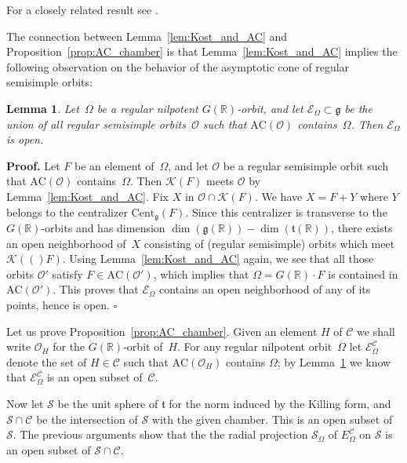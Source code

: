 \documentclass[10pt,leqno]{article}
\newtheorem{lemma}[equation]{Lemma}
\newcommand{\qed}{\hfill $\square$ \medskip}
\newenvironment{proof}[1][Proof]{\noindent\textbf{#1.} }{\qed}
\newcommand{\R}{\mathbb R}
\renewcommand{\t}{\mathfrak t}
\newcommand{\g}{\mathfrak g}
\newcommand{\AC}{\mathrm{AC}}
\newcommand{\Kostant}[1]{\mathcal{K}(#1)}
\newcommand{\ECom}{\mathcal{E}^{\mathcal{C}}_\Omega}
\begin{document}
For a closely related result see \cite[Proposition 3.5]{fm}.

The connection between Lemma~\ref{lem:Kost_and_AC} and Proposition~\ref{prop:AC_chamber} is that Lemma~\ref{lem:Kost_and_AC}  implies the  following observation on the behavior of the asymptotic cone of regular semisimple orbits: 

\begin{lemma}\label{lem:AC_containment} Let~$\Omega$ be a regular nilpotent $G(\R)$-orbit, and let $\mathcal{E}_\Omega \subset \g$ be the union of all regular semisimple orbits~$\mathcal{O}$ such that $\AC(\mathcal{O})$ contains~$\Omega$. Then $\mathcal{E}_\Omega$ is open. 
\end{lemma}

\begin{proof}
Let $F$ be an element of~$\Omega$, and let $\mathcal{O}$  be a regular semisimple orbit such that $\AC(\mathcal{O})$ contains~$\Omega$.
Then $\Kostant{F}$ meets $\mathcal{O}$ by  Lemma~\ref{lem:Kost_and_AC}. 
Fix $X$ in $\mathcal{O} \cap \Kostant{F}$.
We have $X =F+Y$ where $Y$ belongs to the centralizer $\mathrm{Cent}_\g(F)$.
Since this centralizer is transverse to the $G(\R)$-orbits and has dimension $\dim(\g(\R))-\dim(\t(\R))$,
there exists an open neighborhood of~$X$ consisting of (regular semisimple) orbits  which meet $\Kostant(F)$.
Using Lemma~\ref{lem:Kost_and_AC} again, we see that all those orbits $\mathcal{O}'$ satisfy $F \in \AC(\mathcal{O}')$,
which implies that $\Omega = G(\R) \cdot F$ is contained in $\AC(\mathcal{O}')$.
This proves that $\mathcal{E}_\Omega$ contains an open neighborhood of any of its points, hence is open.   \end{proof}


Let us prove Proposition~\ref{prop:AC_chamber}. Given an element $H$ of $\mathcal{C}$ we shall write $\mathcal{O}_H$ for the $G(\R)$-orbit of~$H$. For any regular nilpotent orbit~$\Omega$ let $\ECom$  denote the set of $H \in \mathcal{C}$ such that $\AC(\mathcal{O}_H)$ contains $\Omega$; by Lemma~\ref{lem:AC_containment}  we know that   $\ECom$ is an open subset of~$\mathcal{C}$. 

Now let $\mathcal{S}$ be the unit sphere of $\t$ for the norm induced by the Killing form, and $\mathcal{S} \cap \mathcal{C}$ be the intersection of $\mathcal{S}$ with the given chamber. This is an open subset of $\mathcal{S}$. The previous arguments show that the the radial projection $\mathcal{S}_{\Omega}$ of  $E^{\mathcal{C}}_\Omega$ on $\mathcal{S}$ is an open subset of $\mathcal{S} \cap \mathcal{C}$. 
\end{document}
